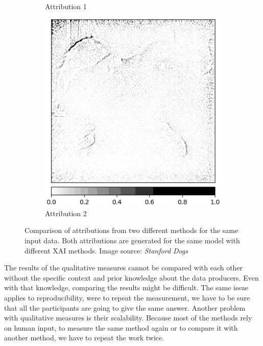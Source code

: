 \begin{figure}[h]
\begin{subfigure}{.23\textwidth}
    \caption{Attribution 1}\label{fig:attr-comparision-deconv}
\end{subfigure}
 \begin{subfigure}{.23\textwidth}
    \centering
    \includegraphics[width=\textwidth]{background/images/gbpJapanese_spaniel.png}
    \caption{Attribution 2}\label{fig:attr-comparision-gbp}
\end{subfigure}

 \caption{Comparison of attributions from two different methods for the same input data. Both attributions are generated for the same model with different XAI methods. Image source: \textit{Stanford Dogs} \cite{stanford-dogs} }\label{fig:attr-comparison}
\end{figure}

The results of the qualitative measures cannot be compared with each other without the specific context and prior knowledge about the data producers. Even with that knowledge, comparing the results might be difficult. The same issue applies to reproducibility, were to repeat the measurement, we have to be sure that all the participants are going to give the same answer. Another problem with qualitative measures is their scalability. Because most of the methods rely on human input, to measure the same method again or to compare it with another method, we have to repeat the work twice.

